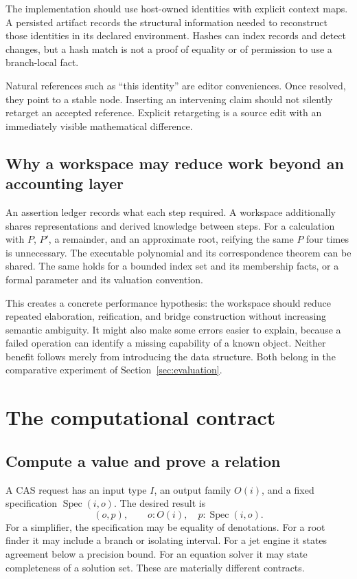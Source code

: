\documentclass[11pt,letterpaper]{article}
\newcommand{\Spec}{\operatorname{Spec}}
\theoremstyle{definition}
\theoremstyle{remark}
\begin{document}
The implementation should use host-owned identities with explicit context
maps. A persisted artifact records the structural information needed to
reconstruct those identities in its declared environment. Hashes can index
records and detect changes, but a hash match is not a proof of equality or of
permission to use a branch-local fact.

Natural references such as ``this identity'' are editor conveniences. Once
resolved, they point to a stable node. Inserting an intervening claim should not
silently retarget an accepted reference. Explicit retargeting is a source edit
with an immediately visible mathematical difference.

\subsection{Why a workspace may reduce work beyond an accounting layer}
An assertion ledger records what each step required. A workspace additionally
shares representations and derived knowledge between steps. For a calculation
with $P$, $P'$, a remainder, and an approximate root, reifying the same $P$ four
times is unnecessary. The executable polynomial and its correspondence theorem
can be shared. The same holds for a bounded index set and its membership facts,
or a formal parameter and its valuation convention.

This creates a concrete performance hypothesis: the workspace should reduce
repeated elaboration, reification, and bridge construction without increasing
semantic ambiguity. It might also make some errors easier to explain, because
a failed operation can identify a missing capability of a known object. Neither
benefit follows merely from introducing the data structure. Both belong in the
comparative experiment of Section~\ref{sec:evaluation}.

\section{The computational contract}
\label{sec:compute}

\subsection{Compute a value and prove a relation}
A CAS request has an input type $I$, an output family $O(i)$, and a fixed
specification $\Spec(i,o)$. The desired result is
\[
 (o,p),\qquad o:O(i),\quad p:\Spec(i,o).
\]
For a simplifier, the specification may be equality of denotations. For a
root finder it may include a branch or isolating interval. For a jet engine
it states agreement below a precision bound. For an equation solver it may
state completeness of a solution set. These are materially different contracts.
\end{document}

